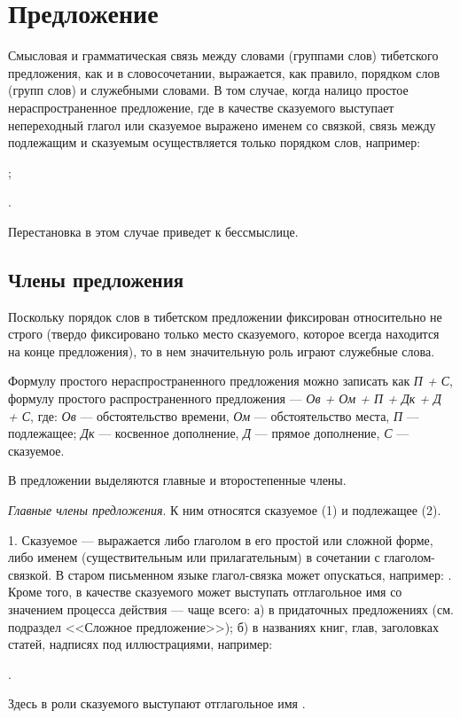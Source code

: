 \section{Предложение}

Смысловая и грамматическая связь между словами (группами слов) тибетского предложения, как и в словосочетании, выражается, как правило, порядком слов (групп слов) и служебными словами. В том случае, когда налицо простое нераспространенное предложение, где в качестве сказуемого выступает непереходный глагол или сказуемое выражено именем со связкой, связь между подлежащим и сказуемым осуществляется только порядком слов, например:
\begin{prfsample}
	\item {};
	\item {}.
\end{prfsample}
Перестановка в этом случае приведет к бессмыслице.

\subsection{Члены предложения}

Поскольку порядок слов в тибетском предложении фиксирован относительно не строго (твердо фиксировано только место сказуемого, которое всегда находится на конце предложения), то в нем значительную роль играют служебные слова.

Формулу простого нераспространенного предложения можно записать как \emph{П + С}, формулу простого распространенного предложения --- \emph{Ов + Ом + П + Дк + Д + С}, где:
\emph{Ов} --- обстоятельство времени,
\emph{Ом} --- обстоятельство места,
\emph{П} --- подлежащее;
\emph{Дк} --- косвенное дополнение,
\emph{Д} --- прямое дополнение,
\emph{С} --- сказуемое.

В предложении выделяются главные и второстепенные члены.

\emph{Главные члены предложения}. К ним относятся сказуемое (1) и подлежащее (2).

1. Сказуемое --- выражается либо глаголом в его простой или сложной форме, либо именем (существительным или прилагательным) в сочетании с глаголом-связкой. В старом письменном языке глагол-связка может опускаться, например:
.
Кроме того, в качестве сказуемого может выступать отглагольное имя со значением процесса действия --- чаще всего: а) в придаточных предложениях (см. подраздел <<Сложное предложение>>); б) в названиях книг, глав, заголовках статей, надписях
под иллюстрациями, например:
\begin{prfsample}
	\item {}.
\end{prfsample}
Здесь в роли сказуемого выступают отглагольное имя .

